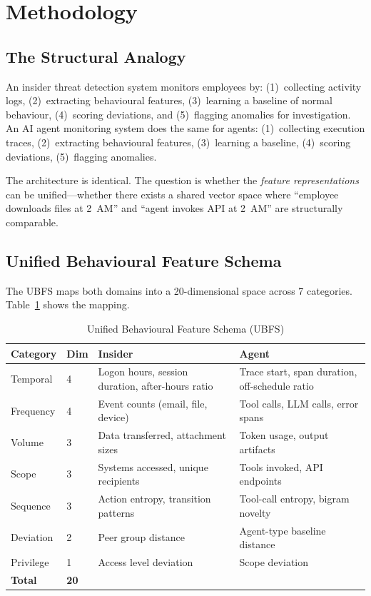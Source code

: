 \documentclass[conference]{IEEEtran}
\begin{document}
\section{Methodology}
\label{sec:methodology}

\subsection{The Structural Analogy}
\label{sec:analogy}

An insider threat detection system monitors employees by: (1)~collecting activity logs, (2)~extracting behavioural features, (3)~learning a baseline of normal behaviour, (4)~scoring deviations, and (5)~flagging anomalies for investigation. An AI agent monitoring system does the same for agents: (1)~collecting execution traces, (2)~extracting behavioural features, (3)~learning a baseline, (4)~scoring deviations, (5)~flagging anomalies.

The architecture is identical. The question is whether the \textit{feature representations} can be unified---whether there exists a shared vector space where ``employee downloads files at 2~AM'' and ``agent invokes API at 2~AM'' are structurally comparable.

\subsection{Unified Behavioural Feature Schema}
\label{sec:ubfs}

The UBFS maps both domains into a 20-dimensional space across 7 categories. Table~\ref{tab:ubfs} shows the mapping.

\begin{table}[htbp]
\caption{Unified Behavioural Feature Schema (UBFS)}
\label{tab:ubfs}
\centering
\small
\begin{tabular}{llp{2.1cm}p{2.1cm}}
\toprule
\textbf{Category} & \textbf{Dim} & \textbf{Insider} & \textbf{Agent} \\
\midrule
Temporal & 4 & Logon hours, session duration, after-hours ratio & Trace start, span duration, off-schedule ratio \\
\addlinespace
Frequency & 4 & Event counts (email, file, device) & Tool calls, LLM calls, error spans \\
\addlinespace
Volume & 3 & Data transferred, attachment sizes & Token usage, output artifacts \\
\addlinespace
Scope & 3 & Systems accessed, unique recipients & Tools invoked, API endpoints \\
\addlinespace
Sequence & 3 & Action entropy, transition patterns & Tool-call entropy, bigram novelty \\
\addlinespace
Deviation & 2 & Peer group distance & Agent-type baseline distance \\
\addlinespace
Privilege & 1 & Access level deviation & Scope deviation \\
\midrule
\textbf{Total} & \textbf{20} & & \\
\bottomrule
\end{tabular}
\end{table}
\end{document}
